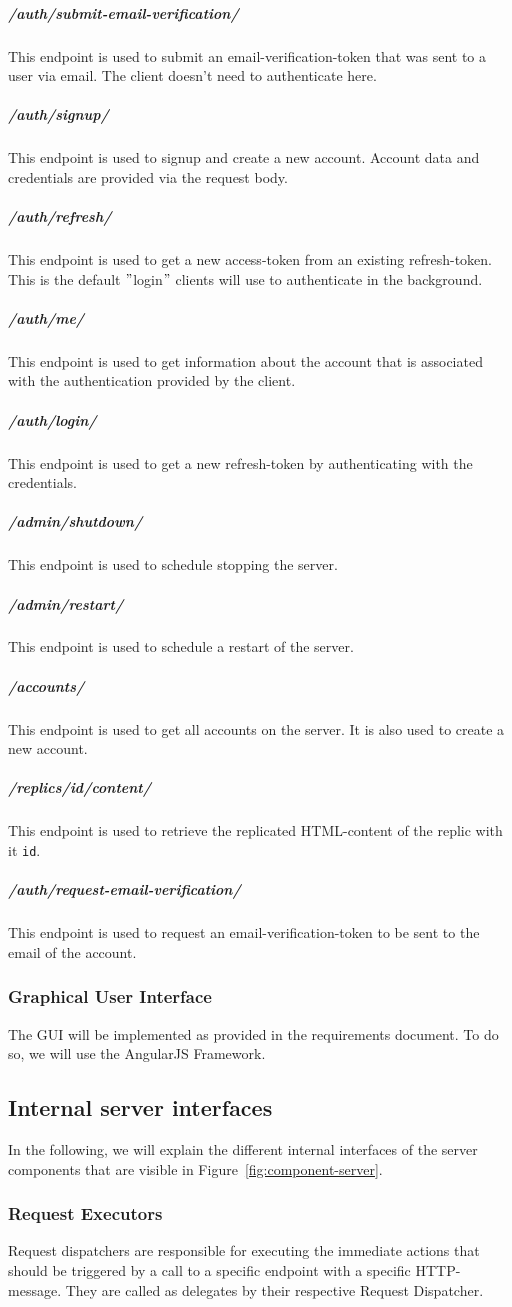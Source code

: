 \subparagraph{/auth/submit-email-verification/} This endpoint is used to submit an email-verification-token that was sent to a user via email.
The client doesn't need to authenticate here.

\subparagraph{/auth/signup/} This endpoint is used to signup and create a new account.
Account data and credentials are provided via the request body.

\subparagraph{/auth/refresh/} This endpoint is used to get a new access-token from an existing refresh-token.
This is the default \("\)login\("\) clients will use to authenticate in the background.

\subparagraph{/auth/me/} This endpoint is used to get information about the account that is associated with the authentication provided by the client.

\subparagraph{/auth/login/} This endpoint is used to get a new refresh-token by authenticating with the credentials.

\subparagraph{/admin/shutdown/} This endpoint is used to schedule stopping the server.

\subparagraph{/admin/restart/} This endpoint is used to schedule a restart of the server.

\subparagraph{/accounts/} This endpoint is used to get all accounts on the server.
It is also used to create a new account.

\subparagraph{/replics/{id}/content/} This endpoint is used to retrieve the replicated HTML-content of the replic with it \texttt{id}.

\subparagraph{/auth/request-email-verification/} This endpoint is used to request an email-verification-token to be sent to the email of the account.

\subsubsection{Graphical User Interface}
The GUI will be implemented as provided in the requirements document.
To do so, we will use the AngularJS Framework.

\subsection{Internal server interfaces}\label{subsec:internal-server-interfaces}
In the following, we will explain the different internal interfaces of the server components that are visible in Figure~\ref{fig:component-server}.

\subsubsection{Request Executors}
Request dispatchers are responsible for executing the immediate actions that should be triggered by a call to a specific endpoint with a specific HTTP-message.
They are called as delegates by their respective Request Dispatcher.

